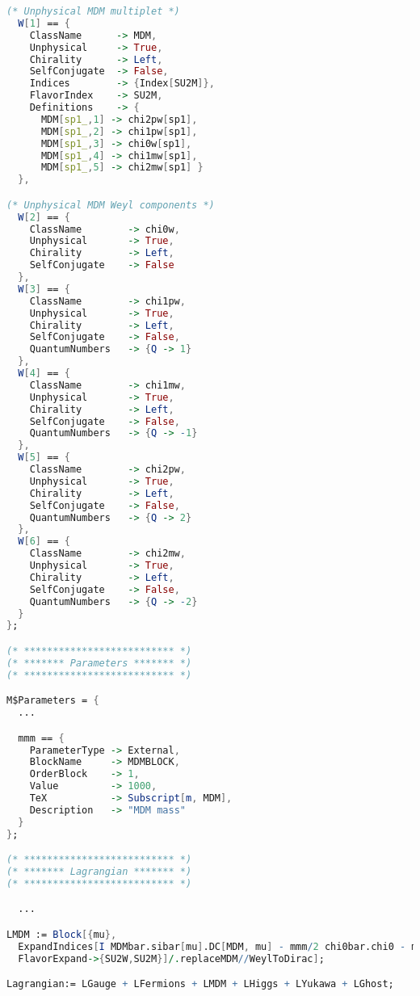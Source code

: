\documentclass[12pt,twoside,book]{article}
\begin{document}
\begin{lstlisting}[caption=\texttt{mdm.fr}, label=list:mdm, language=Mathematica]
(* Unphysical MDM multiplet *)
  W[1] == {
    ClassName      -> MDM,
    Unphysical     -> True,
    Chirality      -> Left,
    SelfConjugate  -> False,
    Indices        -> {Index[SU2M]},
    FlavorIndex    -> SU2M,
    Definitions    -> {
      MDM[sp1_,1] -> chi2pw[sp1],
      MDM[sp1_,2] -> chi1pw[sp1],
      MDM[sp1_,3] -> chi0w[sp1],
      MDM[sp1_,4] -> chi1mw[sp1],
      MDM[sp1_,5] -> chi2mw[sp1] }
  },

(* Unphysical MDM Weyl components *)
  W[2] == {
    ClassName        -> chi0w,
    Unphysical       -> True,
    Chirality        -> Left,
    SelfConjugate    -> False
  },
  W[3] == {
    ClassName        -> chi1pw,
    Unphysical       -> True,
    Chirality        -> Left,
    SelfConjugate    -> False,
    QuantumNumbers   -> {Q -> 1}
  },
  W[4] == {
    ClassName        -> chi1mw,
    Unphysical       -> True,
    Chirality        -> Left,
    SelfConjugate    -> False,
    QuantumNumbers   -> {Q -> -1}
  },
  W[5] == {
    ClassName        -> chi2pw,
    Unphysical       -> True,
    Chirality        -> Left,
    SelfConjugate    -> False,
    QuantumNumbers   -> {Q -> 2}
  },
  W[6] == {
    ClassName        -> chi2mw,
    Unphysical       -> True,
    Chirality        -> Left,
    SelfConjugate    -> False,
    QuantumNumbers   -> {Q -> -2}
  }
};

(* ************************** *)
(* ******* Parameters ******* *)
(* ************************** *)

M$Parameters = {
  ...

  mmm == {
    ParameterType -> External,
    BlockName     -> MDMBLOCK,
    OrderBlock    -> 1,
    Value         -> 1000,
    TeX           -> Subscript[m, MDM],
    Description   -> "MDM mass"
  }
};

(* ************************** *)
(* ******* Lagrangian ******* *)
(* ************************** *)

  ...

LMDM := Block[{mu},
  ExpandIndices[I MDMbar.sibar[mu].DC[MDM, mu] - mmm/2 chi0bar.chi0 - mmm chi1bar.chi1 - mmm chi2bar.chi2,
  FlavorExpand->{SU2W,SU2M}]/.replaceMDM//WeylToDirac];

Lagrangian:= LGauge + LFermions + LMDM + LHiggs + LYukawa + LGhost;
\end{lstlisting}

% 
% 
\end{document}
